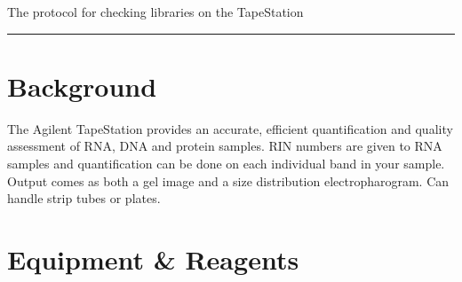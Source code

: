 \documentclass[
  letterpaper,
  DIV=11,
  numbers=noendperiod]{scrreprt}
\begin{document}
The protocol for checking libraries on the TapeStation

\begin{center}\rule{0.5\linewidth}{0.5pt}\end{center}

\hypertarget{background-2}{%
\section*{\texorpdfstring{\textbf{Background}}{Background}}\label{background-2}}

The Agilent TapeStation provides an accurate, efficient quantification
and quality assessment of RNA, DNA and protein samples. RIN numbers are
given to RNA samples and quantification can be done on each individual
band in your sample. Output comes as both a gel image and a size
distribution electropharogram. Can handle strip tubes or plates.

\hypertarget{equipment-reagents-1}{%
\section*{\texorpdfstring{\textbf{Equipment \&
Reagents}}{Equipment \& Reagents}}\label{equipment-reagents-1}}
\end{document}
